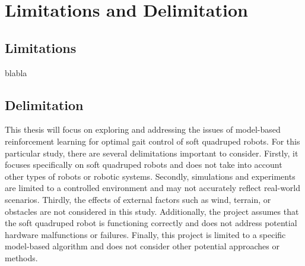 
\section{Limitations and Delimitation}
\subsection*{Limitations}
blabla

\subsection*{Delimitation}
 This thesis will focus on exploring and addressing the issues of model-based reinforcement learning for optimal gait control of soft quadruped robots. For this particular study, there are several delimitations important to consider. Firstly, it focuses specifically on soft quadruped robots and does not take into account other types of robots or robotic systems. Secondly, simulations and experiments are limited to a controlled environment and may not accurately reflect real-world scenarios. Thirdly, the effects of external factors such as wind, terrain, or obstacles are not considered in this study. Additionally, the project assumes that the soft quadruped robot is functioning correctly and does not address potential hardware malfunctions or failures. Finally, this project is limited to a specific model-based algorithm and does not consider other potential approaches or methods.
 
